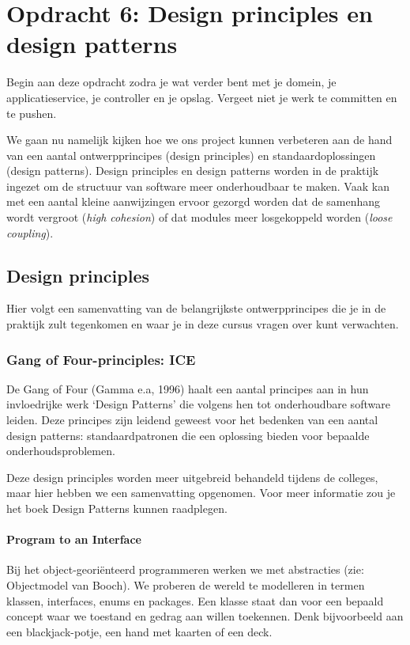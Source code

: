 \documentclass[dutch,a4paper,12pt,doubleside]{book}
\begin{document}
\setcounter{chapter}{5}
\chapter{Opdracht 6: Design principles en design patterns}
Begin aan deze opdracht zodra je wat verder bent 
met je domein, je applicatieservice, je controller en je opslag.
Vergeet niet je werk te committen en te pushen.

We gaan nu namelijk kijken hoe we ons project kunnen verbeteren aan de hand van 
een aantal ontwerpprincipes (design principles) en standaardoplossingen (design patterns).
Design principles en design patterns worden in de praktijk ingezet om 
de structuur van software meer onderhoudbaar te maken. Vaak kan met een aantal kleine 
aanwijzingen ervoor gezorgd worden dat de samenhang wordt vergroot (\textit{high cohesion})
of dat modules meer losgekoppeld worden (\textit{loose coupling}).

\section{Design principles}
Hier volgt een samenvatting van de belangrijkste ontwerpprincipes die je in de praktijk 
zult tegenkomen en waar je in deze cursus vragen over kunt verwachten.

\subsection{Gang of Four-principles: ICE}
De Gang of Four (Gamma e.a, 1996) haalt een aantal principes aan 
in hun invloedrijke werk `Design Patterns' die volgens hen tot onderhoudbare 
software leiden. Deze principes zijn leidend geweest voor het bedenken 
van een aantal design patterns: standaardpatronen die een oplossing bieden 
voor bepaalde onderhoudsproblemen.

Deze design principles worden meer uitgebreid behandeld tijdens de colleges,
maar hier hebben we een samenvatting opgenomen. Voor meer informatie zou 
je het boek Design Patterns kunnen raadplegen.

\subsubsection{Program to an Interface}
Bij het object-georiënteerd programmeren werken we met abstracties (zie: Objectmodel van Booch).
We proberen de wereld te modelleren in termen klassen, interfaces, enums en packages.
Een klasse staat dan voor een bepaald concept waar we toestand en gedrag aan willen 
toekennen. Denk bijvoorbeeld aan een blackjack-potje, een hand met kaarten of een deck.
\end{document}
